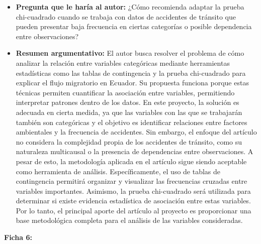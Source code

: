 \documentclass[12pt]{article}
\begin{document}
\begin{itemize}
	\item \textbf{Pregunta que le haría al autor:} ¿Cómo recomienda adaptar la prueba chi-cuadrado cuando se trabaja con datos de accidentes de tránsito que pueden presentar 
    baja frecuencia en ciertas categorías o posible dependencia entre observaciones?
    
	\item \textbf{Resumen argumentativo:} El autor busca resolver el problema de cómo analizar la relación entre variables categóricas mediante herramientas estadísticas 
    como las tablas de contingencia y la prueba chi-cuadrado para explicar el flujo migratorio en Ecuador. Su propuesta funciona porque estas técnicas permiten cuantificar 
    la asociación entre variables, permitiendo interpretar patrones dentro de los datos. En este proyecto, la solución es adecuada en cierta medida, ya que las variables 
    con las que se trabajarán también son categóricas y el objetivo es identificar relaciones entre factores ambientales y la frecuencia de accidentes. Sin embargo, el enfoque 
    del artículo no considera la complejidad propia de los accidentes de tránsito, como su naturaleza multicausal o la presencia de dependencias entre observaciones. A pesar de 
    esto, la metodología aplicada en el artículo sigue siendo aceptable como herramienta de análisis. Específicamente, el uso de tablas de contingencia permitirá organizar y 
    visualizar las frecuencias cruzadas entre variables importantes. Asimismo, la prueba chi-cuadrado será utilizada para determinar si existe evidencia estadística de asociación 
    entre estas variables. Por lo tanto, el principal aporte del artículo al proyecto es proporcionar una base metodológica completa para el análisis de las variables consideradas.\\
\end{itemize} 

\textbf{Ficha 6:}
\end{document}
